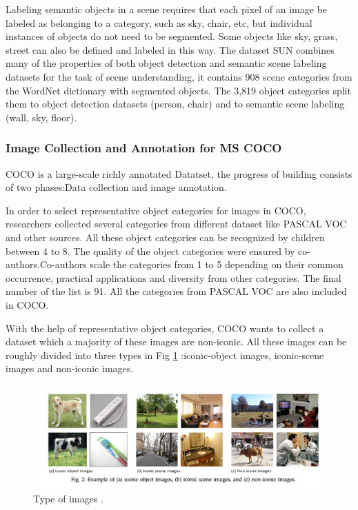 \documentclass[
]{krantz}
\begin{document}
Labeling semantic objects in a scene requires that each pixel of an image be labeled as belonging to a category, such as sky, chair, etc, but individual instances of objects do not need to be segmented. \citep{mccoco} Some objects like sky, grass, street can also be defined and labeled in this way.
The dataset SUN \citep{sun} combines many of the properties of both object detection and semantic scene labeling datasets for the task of scene understanding, it contains 908 scene categories from the WordNet dictionary \citep{WordNet} with segmented objects.
The 3,819 object categories split them to object detection datasets (person, chair) and to semantic scene labeling (wall, sky, floor). \citep{mccoco}

\hypertarget{image-collection-and-annotation-for-ms-coco}{%
\subsubsection{Image Collection and Annotation for MS COCO}\label{image-collection-and-annotation-for-ms-coco}}

COCO is a large-scale richly annotated Datatset, the progress of building consists of two phases:Data collection and image annotation.

In order to select representative object categories for images in COCO, researchers collected several categories from different dataset like PASCAL VOC \citep{pascalvoc} and other sources. All these object categories can be recognized by children between 4 to 8. The quality of the object categories were ensured by co-authors.Co-authors scale the categories from 1 to 5 depending on their common occurrence, practical applications and diversity from other categories. \citep{mccoco} The final number of the list is 91. All the categories from PASCAL VOC are also included in COCO. \citep{pascalvoc}

With the help of representative object categories, COCO wants to collect a dataset which a majority of these images are non-iconic. All these images can be roughly divided into three types in Fig \ref{fig:imagetype} :iconic-object images, iconic-scene images and non-iconic images.\citep{mccoco}


\begin{figure}

{\centering \includegraphics[width=1\linewidth]{figures/02-01/2.1 imagetype} 

}

\caption{Type of images \citep{mccoco}.}\label{fig:imagetype}
\end{figure}
\end{document}
